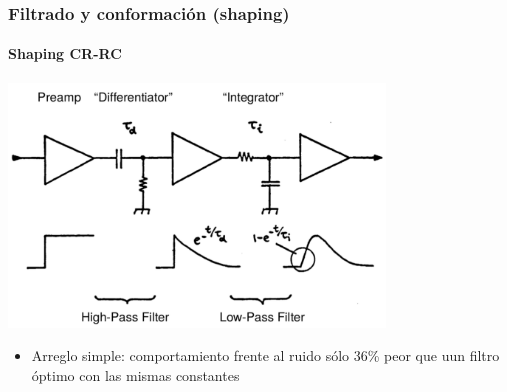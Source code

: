 \documentclass{beamer}
\begin{document}
\begin{frame}
\frametitle{Filtrado y conformación (shaping)}
\framesubtitle{{\color{blue}Shaping CR-RC}}
\begin{center}
\includegraphics[width=0.75\textwidth]{d2/cr_rc_shaping2}
\end{center}
\begin{itemize}
\item Arreglo simple: comportamiento frente al ruido sólo 36\% peor que uun
filtro óptimo con las mismas constantes 
\end{itemize}
\end{frame}
\end{document}
